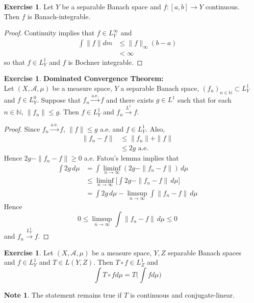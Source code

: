 \documentclass[12pt]{amsart}
\theoremstyle{definition}
\newtheorem{note}[definition]{Note}
\newtheorem{ex}[definition]{Exercise}
\newcommand{\N}{\mathbb{N}}
\newcommand{\MA}{\mathcal{A}}
\newcommand{\dmu}{\, d \mu}
\newcommand{\limfn}{\liminf \limits_{n \rightarrow \infty}}
\newcommand{\limpn}{\limsup \limits_{n \rightarrow \infty}}
\newcommand{\convt}[1]{\xrightarrow{\text{#1}}}
\newcommand{\conv}[1]{\xrightarrow{#1}}
\newcommand{\lex}[1]{\label{ex:#1}}
\begin{document}
	
	\begin{ex} \lex{00000} 
	Let $Y$ be a separable Banach space and $f:[a,b] \rightarrow Y$ continuous. Then $f$ is Banach-integrable.
	\end{ex}
	
	\begin{proof}
	Continuity implies that $f \in L_Y^{\infty}$ and 
	\begin{align*}
	\int \| f \| dm 
	&\leq \| f\|_{\infty}(b-a) \\
	&< \infty
\end{align*}
	so that $f \in L^1_Y$ and $f$ is Bochner integrable.
\end{proof}			
	
	\begin{ex} \lex{00000} \textbf{Dominated Convergence Theorem:}\\  
		Let $(X, \MA, \mu)$ be a measure space, $Y$ a separable Banach space, $(f_n)_{n \in \N} \subset L^1_Y$ and $f \in L^0_Y$. Suppose that $f_n \convt{a.e.} f$ and there exists $g \in L^1$ such that for each $n \in \N$, $\|f_n\| \leq g$. Then $f \in L^1_Y$ and $f_n \conv{L^1} f$. 
	\end{ex}
	
	\begin{proof}
	Since $f_n \convt{a.e.} f$, $\|f\| \leq g$ a.e. and $f \in L^1_Y$. Also, 
	\begin{align*}
	\|f_n - f\| 
	&\leq \|f_n\| + \|f\| \\
	& \leq 2g \text{ a.e.}
	\end{align*}
	Hence $2g - \|f_n - f\| \geq 0$ a.e.
	Fatou's lemma implies that 
	\begin{align*}
	\int 2g \dmu 
	&= \int \limfn(2g - \|f_n - f\|) \dmu \\
	&\leq \limfn \bigg[ \int 2g - \|f_n - f\| \dmu \bigg] \\
	&= \int 2g \dmu - \limpn \int \|f_n - f\| \dmu
\end{align*}	 
	Hence $$0 \leq \limpn \int \|f_n - f\| \dmu \leq 0$$  and $f_n \conv{L^1_Y} f$.
	\end{proof}		
	
	\begin{ex} \lex{00000} 
	Let $(X, \MA, \mu)$ be a measure space, $Y,Z$ separable Banach spaces and $f \in L^1_Y$ and $T \in L(Y,Z)$. Then $T \circ f \in L^1_Z$ and $$\int T \circ f d \mu = T\bigg( \int f d\mu \bigg)$$
	\end{ex}
	
	\begin{note}
	The statement remains true if $T$ is continuous and conjugate-linear. 
	\end{note}
	
\end{document}
